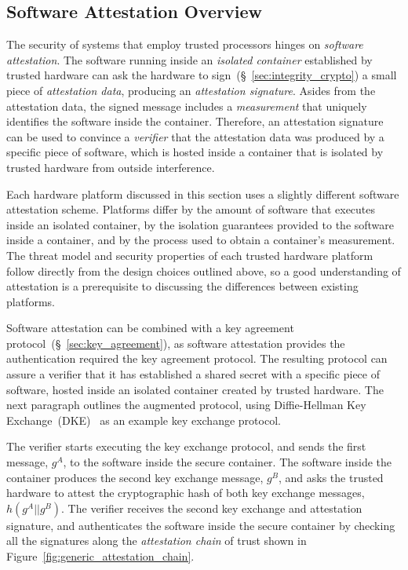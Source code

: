 \subsection{Software Attestation Overview}
\label{sec:generic_software_attestation}

The security of systems that employ trusted processors hinges on
\textit{software attestation}. The software running inside an \textit{isolated
container} established by trusted hardware can ask the hardware to
sign~(\S~\ref{sec:integrity_crypto}) a small piece of \textit{attestation
data}, producing an \textit{attestation signature}. Asides from the attestation
data, the signed message includes a \textit{measurement} that uniquely
identifies the software inside the container. Therefore, an attestation
signature can be used to convince a \textit{verifier} that the attestation data
was produced by a specific piece of software, which is hosted inside a
container that is isolated by trusted hardware from outside interference.

Each hardware platform discussed in this section uses a slightly different
software attestation scheme. Platforms differ by the amount of software that
executes inside an isolated container, by the isolation guarantees provided to
the software inside a container, and by the process used to obtain a
container's measurement. The threat model and security properties of each
trusted hardware platform follow directly from the design choices outlined
above, so a good understanding of attestation is a prerequisite to discussing
the differences between existing platforms.

Software attestation can be combined with a key agreement
protocol~(\S~\ref{sec:key_agreement}), as software attestation provides the
authentication required the key agreement protocol. The resulting protocol can
assure a verifier that it has established a shared secret with a specific piece
of software, hosted inside an isolated container created by trusted hardware.
The next paragraph outlines the augmented protocol, using Diffie-Hellman Key
Exchange~(DKE)~\cite{diffie1976keyexchange} as an example key exchange
protocol.

The verifier starts executing the key exchange protocol, and sends the first
message, $g^{A}$, to the software inside the secure container. The software
inside the container produces the second key exchange message, $g^{B}$, and
asks the trusted hardware to attest the cryptographic hash of both key exchange
messages, $h(g^{A} || g^{B})$. The verifier receives the second key exchange
and attestation signature, and authenticates the software inside the secure
container by checking all the signatures along the \textit{attestation chain}
of trust shown in Figure~\ref{fig:generic_attestation_chain}.

